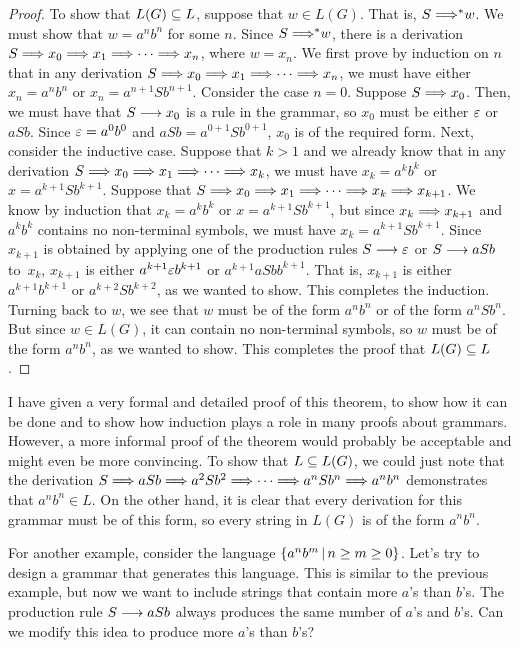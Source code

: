 \begin{proof}
To show that $L(G)\subseteq L$, suppose that $w\in L(G)$.  That is,
$S\;{\Longrightarrow}^* w$.  We must show that $w=a^nb^n$ for some $n$.
Since $S\;{\Longrightarrow}^* w$, there is a derivation
$S\Longrightarrow x_0\Longrightarrow x_1\Longrightarrow\cdots\Longrightarrow x_n$, where $w=x_n$.
We first prove by induction on $n$ that in any derivation
$S\Longrightarrow x_0\Longrightarrow x_1\Longrightarrow\cdots\Longrightarrow x_n$,
we must have either $x_n=a^nb^n$ or $x_n=a^{n+1}Sb^{n+1}$.
Consider the case $n=0$.  Suppose $S\Longrightarrow x_0$.
Then, we must have that $S\longrightarrow x_0$ is a rule in the grammar,
so $x_0$ must be either $\varepsilon$ or $aSb$. Since $\varepsilon=a^0b^0$
and $aSb=a^{0+1}Sb^{0+1}$, $x_0$ is of the required form. 
Next, consider the inductive case.  Suppose that $k>1$ and we already 
know that in any
derivation $S\Longrightarrow x_0\Longrightarrow x_1\Longrightarrow\cdots\Longrightarrow x_k$,
we must have $x_k=a^kb^k$ or $x=a^{k+1}Sb^{k+1}$.  Suppose that
$S\Longrightarrow x_0\Longrightarrow x_1\Longrightarrow\cdots\Longrightarrow x_k\Longrightarrow x_{k+1}$.
We know by induction that $x_k=a^kb^k$ or $x=a^{k+1}Sb^{k+1}$,
but since $x_k\Longrightarrow x_{k+1}$ and $a^kb^k$ contains no non-terminal
symbols, we must have $x_k=a^{k+1}Sb^{k+1}$.  Since $x_{k+1}$
is obtained by applying one of the production rules $S\longrightarrow\varepsilon$
or $S\longrightarrow aSb$ to~$x_k$, $x_{k+1}$ is either $a^{k+1}\varepsilon b^{k+1}$
or $a^{k+1}aSbb^{k+1}$.  That is, $x_{k+1}$ is either $a^{k+1}b^{k+1}$
or $a^{k+2}Sb^{k+2}$, as we wanted to show.  This completes the induction.
Turning back to $w$, we see that $w$ must be of the form $a^nb^n$ or
of the form $a^nSb^n$.  But since $w\in L(G)$, it can contain no
non-terminal symbols, so $w$ must be of the form $a^nb^n$, as we wanted to show.
This completes the proof that $L(G)\subseteq L$.
\end{proof}
I have given a very formal and detailed proof of this theorem, to show how it
can be done and to show how induction plays a role in many proofs about
grammars.  However, a more informal proof of the theorem would probably
be acceptable and might even be more convincing.  To show that
$L\subseteq L(G)$, we could just note that the derivation
$S\Longrightarrow aSb\Longrightarrow a^2Sb^2\Longrightarrow\cdots\Longrightarrow a^nSb^n\Longrightarrow a^nb^n$
demonstrates that $a^nb^n\in L$.  On the other hand, it is clear that every
derivation for this grammar must be of this form, so every string in $L(G)$
is of the form $a^nb^n$.

For another example, consider the language $\{a^nb^m\,|\, n\ge m\ge0\}$.
Let's try to design a grammar that generates this language.
This is similar to the previous example, but now we want to include strings that
contain more $a$'s than $b$'s.  The production rule $S\longrightarrow aSb$
always produces the same number of $a$'s and $b$'s.  Can we modify
this idea to produce more $a$'s than $b$'s?

